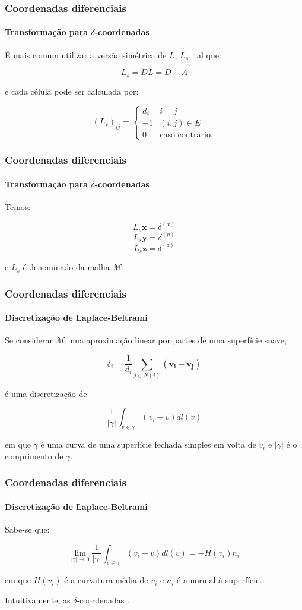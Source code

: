\begin{frame}
\frametitle{Coordenadas diferenciais}
\framesubtitle{Transformação para $\delta$-coordenadas}

É mais comum utilizar a versão simétrica de $L$, $L_s$, tal que:

$$L_s = DL = D - A$$

e cada célula pode ser calculada por:

\begin{equation}
(L_s)_{ij} = \begin{cases}
d_i&i=j\\
-1&(i, j) \in E\\
0&\text{caso contrário.}
\end{cases}
\end{equation}

	
\end{frame}

\begin{frame}
\frametitle{Coordenadas diferenciais}
\framesubtitle{Transformação para $\delta$-coordenadas}

Temos:

$$L_s \textbf{x} = \delta^{(x)}$$
$$L_s \textbf{y} = \delta^{(y)}$$
$$L_s \textbf{z} = \delta^{(z)}$$

e $L_s$ é denominado  da malha $\mathcal M$.

\end{frame}

\begin{frame}
\frametitle{Coordenadas diferenciais}
\framesubtitle{Discretização de Laplace-Beltrami}

Se considerar $\mathcal{M}$ uma aproximação linear por partes de uma superfície suave,

$$\delta_i = \frac{1}{d_i} \sum_{j \in N(i)}(\mathbf{v_i} - \mathbf{v_j})$$

é uma discretização de

$$\frac{1}{|\gamma|} \int_{v \in \gamma} (v_i - v) dl(v)$$

em que $\gamma$ é uma curva de uma superfície fechada simples em volta de $v_i$ e $|\gamma|$ é o comprimento de $\gamma$.

\end{frame}

\begin{frame}
\frametitle{Coordenadas diferenciais}
\framesubtitle{Discretização de Laplace-Beltrami}

Sabe-se que:

$$\lim\limits_{|\gamma|\rightarrow 0} \frac{1}{|\gamma|} \int_{v \in \gamma} (v_i - v) dl(v) = - H(v_i) n_i$$

em que $H(v_i)$ é a curvatura média de $v_i$ e $n_i$ é a normal à superfície.

\medskip

Intuitivamente, as $\delta$-coordenadas .

\end{frame}

